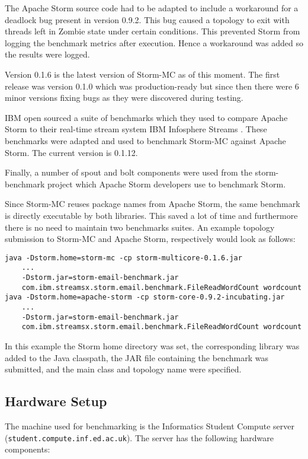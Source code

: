 The Apache Storm source code had to be adapted to include a workaround for a deadlock bug present in version 0.9.2. This bug caused a topology to exit with threads left in Zombie state under certain conditions. This prevented Storm from logging the benchmark metrics after execution. Hence a workaround was added so the results were logged.

Version 0.1.6 is the latest version of Storm-MC as of this moment. The first release was version 0.1.0 which was production-ready but since then there were 6 minor versions fixing bugs as they were discovered during testing.

IBM open sourced a suite of benchmarks which they used to compare Apache Storm to their real-time stream system IBM Infosphere Streams \citep{InfoSphereStreams}. These benchmarks were adapted and used to benchmark Storm-MC against Apache Storm. The current version is 0.1.12.

Finally, a number of spout and bolt components were used from the storm-benchmark project which Apache Storm developers use to benchmark Storm.

Since Storm-MC reuses package names from Apache Storm, the same benchmark is directly executable by both libraries. This saved a lot of time and furthermore there is no need to maintain two benchmarks suites. An example topology submission to Storm-MC and Apache Storm, respectively would look as follows:

\begin{verbatim}
java -Dstorm.home=storm-mc -cp storm-multicore-0.1.6.jar
    ...
    -Dstorm.jar=storm-email-benchmark.jar
    com.ibm.streamsx.storm.email.benchmark.FileReadWordCount wordcount
java -Dstorm.home=apache-storm -cp storm-core-0.9.2-incubating.jar
    ...
    -Dstorm.jar=storm-email-benchmark.jar
    com.ibm.streamsx.storm.email.benchmark.FileReadWordCount wordcount
\end{verbatim}

In this example the Storm home directory was set, the corresponding library was added to the Java classpath, the JAR file containing the benchmark was submitted, and the main class and topology name were specified.

\subsection{Hardware Setup}

The machine used for benchmarking is the Informatics Student Compute server (\texttt{student.compute.inf.ed.ac.uk}). The server has the following hardware components:

